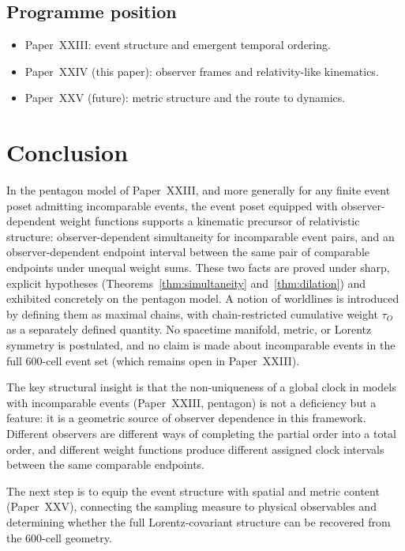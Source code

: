 \documentclass[12pt]{article}
\begin{document}
\subsection{Programme position}

\begin{itemize}
    \item Paper~XXIII: event structure and emergent temporal ordering.
    \item Paper~XXIV (this paper): observer frames and relativity-like kinematics.
    \item Paper~XXV (future): metric structure and the route to dynamics.
\end{itemize}

\section{Conclusion}\label{sec:conclusion}

In the pentagon model of Paper~XXIII, and more generally for any finite event poset admitting incomparable events, the event poset equipped with observer-dependent weight functions supports a kinematic precursor of relativistic structure: observer-dependent simultaneity for incomparable event pairs, and an observer-dependent endpoint interval between the same pair of comparable endpoints under unequal weight sums. These two facts are proved under sharp, explicit hypotheses (Theorems~\ref{thm:simultaneity} and~\ref{thm:dilation}) and exhibited concretely on the pentagon model. A notion of worldlines is introduced by defining them as maximal chains, with chain-restricted cumulative weight $\tau_O$ as a separately defined quantity. No spacetime manifold, metric, or Lorentz symmetry is postulated, and no claim is made about incomparable events in the full 600-cell event set (which remains open in Paper~XXIII).

The key structural insight is that the non-uniqueness of a global clock in models with incomparable events (Paper~XXIII, pentagon) is not a deficiency but a feature: it is a geometric source of observer dependence in this framework. Different observers are different ways of completing the partial order into a total order, and different weight functions produce different assigned clock intervals between the same comparable endpoints.

The next step is to equip the event structure with spatial and metric content (Paper~XXV), connecting the sampling measure to physical observables and determining whether the full Lorentz-covariant structure can be recovered from the 600-cell geometry.



\end{document}
